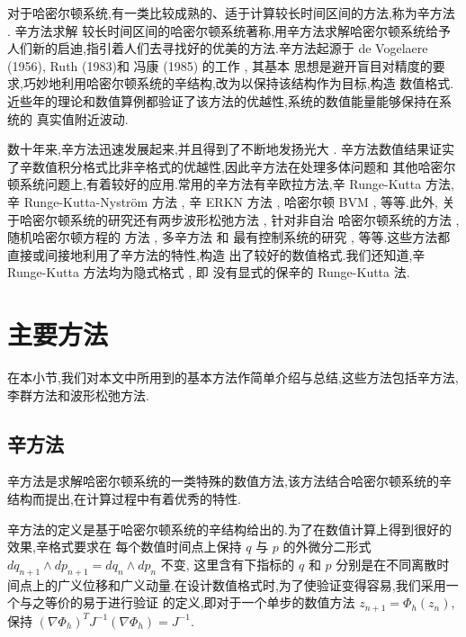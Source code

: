 对于哈密尔顿系统,有一类比较成熟的、适于计算较长时间区间的方法,称为辛方法 \cite{feng2010symplectic}. 辛方法求解
较长时间区间的哈密尔顿系统著称,用辛方法求解哈密尔顿系统给予人们新的启迪,指引着人们去寻找好的优美的方法.辛方法起源于
de Vogelaere (1956), Ruth (1983)和 冯康 (1985) 的工作 \cite{hairer2006geometric}, 其基本
思想是避开盲目对精度的要求,巧妙地利用哈密尔顿系统的辛结构,改为以保持该结构作为目标,构造
数值格式.近些年的理论和数值算例都验证了该方法的优越性,系统的数值能量能够保持在系统的
真实值附近波动.

数十年来,辛方法迅速发展起来,并且得到了不断地发扬光大 \cite{calvo1994numerical,leimkuhler2004simulating,hong2006multi,yang2009extended,monovasilis2013exponentially,xin2016birkhoffian,michalas2016numerical,liao2016multi}. 辛方法数值结果证实了辛数值积分格式比非辛格式的优越性,因此辛方法在处理多体问题和
其他哈密尔顿系统问题上,有着较好的应用.常用的辛方法有辛欧拉方法,辛 Runge-Kutta 方法,
辛 Runge-Kutta-Nystr{\"o}m 方法 \cite{kalogiratou2014fourth,kalogiratou2015}, 辛 ERKN
方法 \cite{wang2014ahigh}, 哈密尔顿 BVM \cite{brugnano2014multi}, 等等.此外,
关于哈密尔顿系统的研究还有两步波形松弛方法 \cite{hassanzadeh2014two}, 针对非自治
哈密尔顿系统的方法 \cite{hong2000numerical,zhang2010anote}, 随机哈密尔顿方程的
方法 \cite{burrage2014structure,ma2015sto,fan2015using}, 多辛方法 \cite{wang2013multi} 和
最有控制系统的研究 \cite{li2015asym}, 等等.这些方法都直接或间接地利用了辛方法的特性,构造
出了较好的数值格式.我们还知道,辛 Runge-Kutta 方法均为隐式格式 \cite{sanz1988runge}, 即
没有显式的保辛的 Runge-Kutta 法.

\section{主要方法}
在本小节,我们对本文中所用到的基本方法作简单介绍与总结,这些方法包括辛方法,李群方法和波形松弛方法.

\subsection{辛方法}

辛方法是求解哈密尔顿系统的一类特殊的数值方法,该方法结合哈密尔顿系统的辛结构而提出,在计算过程中有着优秀的特性.

辛方法的定义是基于哈密尔顿系统的辛结构给出的.为了在数值计算上得到很好的效果,辛格式要求在
每个数值时间点上保持 $q$ 与 $p$ 的外微分二形式 $dq_{n+1}\wedge dp_{n+1}=dq_n\wedge dp_n$ 不变, 这里含有下指标的 $q$ 和 $p$
分别是在不同离散时间点上的广义位移和广义动量.在设计数值格式时,为了使验证变得容易,我们采用一个与之等价的易于进行验证
的定义,即对于一个单步的数值方法 $z_{n+1}=\Phi_h(z_n)$, 保持 $(\nabla\Phi_h)^TJ^{-1}(\nabla\Phi_h)=J^{-1}$.

